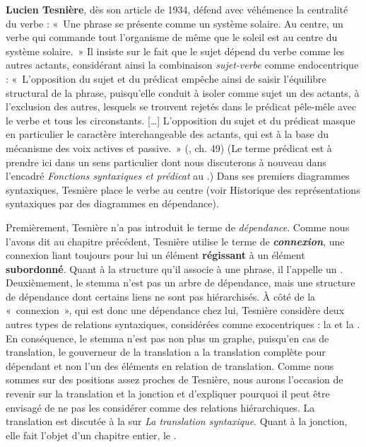 {    \textbf{Lucien Tesnière}, dès son article de 1934, défend avec véhémence la centralité du verbe : «~Une phrase se présente comme un système solaire. Au centre, un verbe qui commande tout l’organisme de même que le soleil est au centre du système solaire.~» Il insiste sur le fait que le sujet dépend du verbe comme les autres actants, considérant ainsi la combinaison \textit{sujet-verbe} comme endocentrique : «~L’opposition du sujet et du prédicat empêche ainsi de saisir l’équilibre structural de la phrase, puisqu’elle conduit à isoler comme sujet un des actants, à l’exclusion des autres, lesquels se trouvent rejetés dans le prédicat pêle-mêle avec le verbe et tous les circonstants. […] L’opposition du sujet et du prédicat masque en particulier le caractère interchangeable des actants, qui est à la base du mécanisme des voix actives et passive.~» (\citeyear{tesniere1959elements}, ch. 49) (Le terme prédicat est à prendre ici dans un sens particulier dont nous discuterons à nouveau dans l’encadré \textit{Fonctions syntaxiques et prédicat} au .) Dans ses premiers diagrammes syntaxiques, Tesnière place le verbe au centre (voir  Historique des représentations syntaxiques par des diagrammes en dépendance).

    Premièrement, Tesnière n’a pas introduit le terme de \textit{dépendance}. Comme nous l’avons dit au chapitre précédent, Tesnière utilise le terme de \textbf{\textit{connexion}}, une connexion liant toujours pour lui un élément \textbf{régissant} à un élément \textbf{subordonné}. Quant à la structure qu’il associe à une phrase, il l’appelle un . Deuxièmement, le stemma n’est pas un arbre de dépendance, mais une structure de dépendance dont certains liens ne sont pas hiérarchisés. À côté de la «~connexion~», qui est donc une dépendance chez lui, Tesnière considère deux autres types de relations syntaxiques, considérées comme exocentriques : la  et la . En conséquence, le stemma n’est pas non plus un graphe, puisqu’en cas de translation, le gouverneur de la translation a la translation complète pour dépendant et non l’un des éléments en relation de translation. Comme nous sommes sur des positions assez proches de Tesnière, nous aurons l’occasion de revenir sur la translation et la jonction et d’expliquer pourquoi il peut être envisagé de ne pas les considérer comme des relations hiérarchiques. La translation est discutée à la  sur \textit{La translation syntaxique}. Quant à la jonction, elle fait l’objet d’un chapitre entier, le .

}
